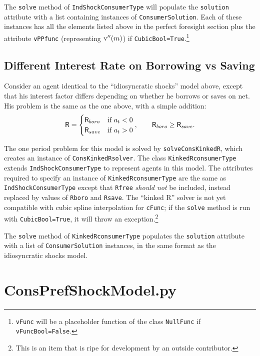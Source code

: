 \documentclass[12pt,titlepage,letterpaper]{econtex}
\begin{document}
The \texttt{solve} method of \texttt{IndShockConsumerType} will populate the \texttt{solution} attribute with a list containing instances of \texttt{ConsumerSolution}.  Each of these instances has all the elements listed above in the perfect foresight section plus the attribute \texttt{vPPfunc} (representing $\mathrm{v}''(m)$) if \texttt{CubicBool=True}.\footnote{\texttt{vFunc} will be a placeholder function of the class \texttt{NullFunc} if \texttt{vFuncBool=False}.}


\subsection{Different Interest Rate on Borrowing vs Saving}

Consider an agent identical to the ``idiosyncratic shocks'' model above, except that his interest factor differs depending on whether he borrows or saves on net.  His problem is the same as the one above, with a simple addition:
\begin{equation*}
\mathsf{R} = \begin{cases}
\mathsf{R}_{boro} & \text{if  } a_t < 0 \\
\mathsf{R}_{save} & \text{if  } a_t > 0
\end{cases}, \qquad \mathsf{R}_{boro} \geq \mathsf{R}_{save}.
\end{equation*}

The one period problem for this model is solved by \texttt{solveConsKinkedR}, which creates an instance of \texttt{ConsKinkedRsolver}.  The class \texttt{KinkedRconsumerType} extends \texttt{IndShockConsumerType} to represent agents in this model.  The attributes required to specify an instance of \texttt{KinkedRconsumerType} are the same as \texttt{IndShockConsumerType} except that \texttt{Rfree} \textit{should not} be included, instead replaced by values of \texttt{Rboro} and \texttt{Rsave}.  The ``kinked R'' solver is not yet compatible with cubic spline interpolation for \texttt{cFunc}; if the \texttt{solve} method is run with \texttt{CubicBool=True}, it will throw an exception.\footnote{This is an item that is ripe for development by an outside contributor.}

The \texttt{solve} method of \texttt{KinkedRconsumerType} populates the \texttt{solution} attribute with a list of \texttt{ConsumerSolution} instances, in the same format as the idiosyncratic shocks model.

\newpage

\section{ConsPrefShockModel.py}
\end{document}
